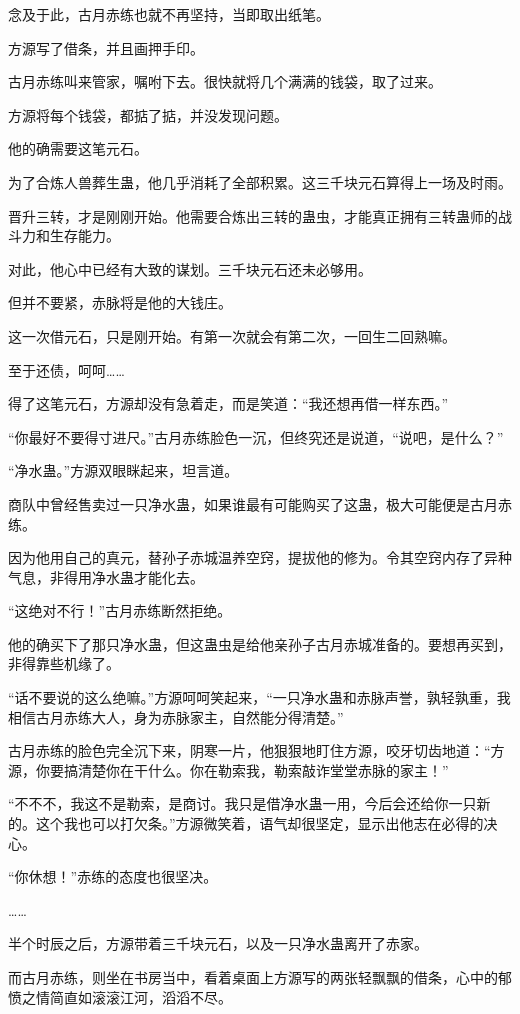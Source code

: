 \begin{this_body}
念及于此，古月赤练也就不再坚持，当即取出纸笔。

方源写了借条，并且画押手印。

古月赤练叫来管家，嘱咐下去。很快就将几个满满的钱袋，取了过来。

方源将每个钱袋，都掂了掂，并没发现问题。

他的确需要这笔元石。

为了合炼人兽葬生蛊，他几乎消耗了全部积累。这三千块元石算得上一场及时雨。

晋升三转，才是刚刚开始。他需要合炼出三转的蛊虫，才能真正拥有三转蛊师的战斗力和生存能力。

对此，他心中已经有大致的谋划。三千块元石还未必够用。

但并不要紧，赤脉将是他的大钱庄。

这一次借元石，只是刚开始。有第一次就会有第二次，一回生二回熟嘛。

至于还债，呵呵……

得了这笔元石，方源却没有急着走，而是笑道：“我还想再借一样东西。”

“你最好不要得寸进尺。”古月赤练脸色一沉，但终究还是说道，“说吧，是什么？”

“净水蛊。”方源双眼眯起来，坦言道。

商队中曾经售卖过一只净水蛊，如果谁最有可能购买了这蛊，极大可能便是古月赤练。

因为他用自己的真元，替孙子赤城温养空窍，提拔他的修为。令其空窍内存了异种气息，非得用净水蛊才能化去。

“这绝对不行！”古月赤练断然拒绝。

他的确买下了那只净水蛊，但这蛊虫是给他亲孙子古月赤城准备的。要想再买到，非得靠些机缘了。

“话不要说的这么绝嘛。”方源呵呵笑起来，“一只净水蛊和赤脉声誉，孰轻孰重，我相信古月赤练大人，身为赤脉家主，自然能分得清楚。”

古月赤练的脸色完全沉下来，阴寒一片，他狠狠地盯住方源，咬牙切齿地道：“方源，你要搞清楚你在干什么。你在勒索我，勒索敲诈堂堂赤脉的家主！”

“不不不，我这不是勒索，是商讨。我只是借净水蛊一用，今后会还给你一只新的。这个我也可以打欠条。”方源微笑着，语气却很坚定，显示出他志在必得的决心。

“你休想！”赤练的态度也很坚决。

……

半个时辰之后，方源带着三千块元石，以及一只净水蛊离开了赤家。

而古月赤练，则坐在书房当中，看着桌面上方源写的两张轻飘飘的借条，心中的郁愤之情简直如滚滚江河，滔滔不尽。


\end{this_body}

